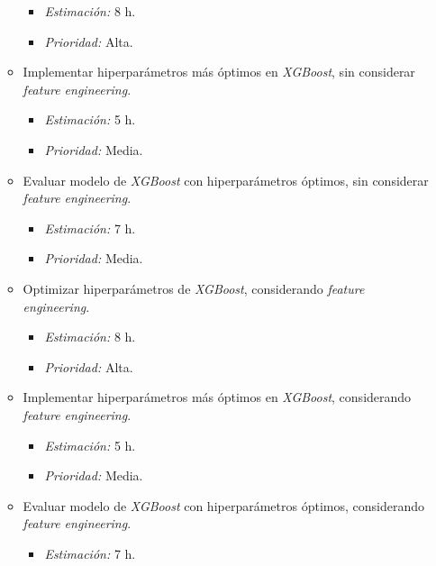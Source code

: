 \documentclass[
11pt, %
]{charter}
\begin{document}
\begin{itemize}
\begin{itemize}
                \begin{itemize}
                    \item \textit{Estimación:} 8 h.
                    \item \textit{Prioridad:} Alta.
                \end{itemize}
            \item Implementar hiperparámetros más óptimos en \textit{XGBoost}, sin considerar \textit{feature engineering}.
                \begin{itemize}
                    \item \textit{Estimación:} 5 h.
                    \item \textit{Prioridad:} Media.
                \end{itemize}
            \item Evaluar modelo de \textit{XGBoost} con hiperparámetros óptimos, sin considerar \textit{feature engineering}.
                \begin{itemize}
                    \item \textit{Estimación:} 7 h.
                    \item \textit{Prioridad:} Media.
                \end{itemize}
            \item Optimizar hiperparámetros de \textit{XGBoost}, considerando \textit{feature engineering}.
                \begin{itemize}
                    \item \textit{Estimación:} 8 h.
                    \item \textit{Prioridad:} Alta.
                \end{itemize}
            \item Implementar hiperparámetros más óptimos en \textit{XGBoost}, considerando \textit{feature engineering}.
                \begin{itemize}
                    \item \textit{Estimación:} 5 h.
                    \item \textit{Prioridad:} Media.
                \end{itemize}
            \item Evaluar modelo de \textit{XGBoost} con hiperparámetros óptimos, considerando \textit{feature engineering}.
                \begin{itemize}
                    \item \textit{Estimación:} 7 h.

\end{itemize}
\end{itemize}
\end{itemize}
\end{document}
